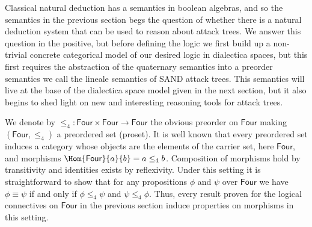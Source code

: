 Classical natural deduction has a semantics in boolean algebras, and
so the semantics in the previous section begs the question of whether
there is a natural deduction system that can be used to reason about
attack trees.  We answer this question in the positive, but before
defining the logic we first build up a non-trivial concrete
categorical model of our desired logic in dialectica spaces, but this
first requires the abstraction of the quaternary semantics into a
preorder semantics we call the lineale semantics of SAND attack trees.
This semantics will live at the base of the dialectica space model
given in the next section, but it also begins to shed light on new and
interesting reasoning tools for attack trees.

\newcommand{\Four}[0]{\mathsf{Four}} We denote by $\leq_4 : \Four
\times \Four \to \Four$ the obvious preorder on $\Four$ making
$(\Four, \leq_4)$ a preordered set (proset).  It is well known that
every preordered set induces a category whose objects are the elements
of the carrier set, here $\Four$, and morphisms $\Hom{\Four}{a}{b} = a
\leq_4 b$.  Composition of morphisms hold by transitivity and
identities exists by reflexivity.  Under this setting it is
straightforward to show that for any propositions $\phi$ and $\psi$
over $\Four$ we have $\phi \equiv \psi$ if and only if $\phi \leq_4
\psi$ and $\psi \leq_4 \phi$.  Thus, every result proven for the
logical connectives on $\Four$ in the previous section induce
properties on morphisms in this setting.

